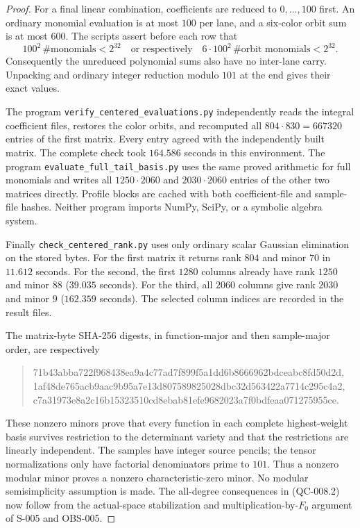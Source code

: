 \begin{proof}
For a final linear combination, coefficients are reduced to
$0,\ldots,100$ first. An ordinary monomial evaluation is at most $100$
per lane, and a six-color orbit sum is at most $600$. The scripts
assert before each row that
\[
 100^2\,\#\text{monomials}<2^{32}
 \quad\text{or respectively}\quad
 6\cdot100^2\,\#\text{orbit monomials}<2^{32}.
 \tag{QC-008.4}
\]
Consequently the unreduced polynomial sums also have no inter-lane
carry. Unpacking and ordinary integer reduction modulo $101$ at the
end gives their exact values.

The program \texttt{verify\_centered\_evaluations.py} independently
reads the integral coefficient files, restores the color orbits, and
recomputed all $804\cdot830=667320$ entries of the first matrix.
Every entry agreed with the independently built matrix. The complete
check took $164.586$ seconds in this environment. The program
\texttt{evaluate\_full\_tail\_basis.py} uses the same proved arithmetic
for full monomials and writes all $1250\cdot2060$ and
$2030\cdot2060$ entries of the other two matrices directly. Profile
blocks are cached with both coefficient-file and sample-file hashes.
Neither program imports NumPy, SciPy, or a symbolic algebra system.

Finally \texttt{check\_centered\_rank.py} uses only ordinary scalar
Gaussian elimination on the stored bytes. For the first matrix it
returns rank $804$ and minor $70$ in $11.612$ seconds. For the second,
the first $1280$ columns already have rank $1250$ and minor $88$
($39.035$ seconds). For the third, all $2060$ columns give rank $2030$
and minor $9$ ($162.359$ seconds). The selected column indices are
recorded in the result files.

The matrix-byte SHA-256 digests, in function-major and then sample-major
order, are respectively
\begin{quote}\ttfamily\small
71b43abba722f968438ea9a4c77ad7f899f5a1dd6b8666962bdceabc8fd50d2d,\\
1af48de765acb9aac9b95a7e13d807589825028dbc32d563422a7714c295c4a2,\\
c7a31973e8a2c16b15323510cd8ebab81efe9682023a7f0bdfeaa071275955ce.
\end{quote}
These nonzero minors prove that every function in each complete
highest-weight basis survives restriction to the determinant variety
and that the restrictions are linearly independent. The samples have
integer source pencils; the tensor normalizations only have factorial
denominators prime to $101$. Thus a nonzero modular minor proves a
nonzero characteristic-zero minor. No modular semisimplicity assumption
is made. The all-degree consequences in (QC-008.2) now follow from the
actual-space stabilization and multiplication-by-$F_0$ argument of
S-005 and OBS-005.
\end{proof}

